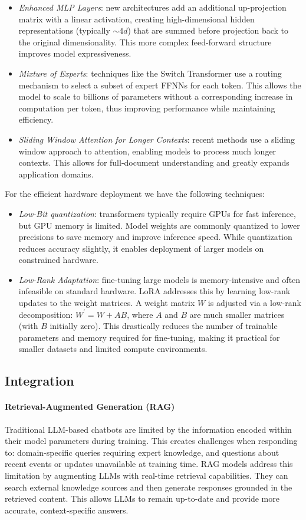 \begin{itemize}
    \item \textit{Enhanced MLP Layers}: new architectures add an additional up-projection matrix with a linear activation, creating high-dimensional hidden representations (typically $\sim4d$) that are summed before projection back to the original dimensionality. 
        This more complex feed-forward structure improves model expressiveness.
    \item \textit{Mixture of Experts}: techniques like the Switch Transformer use a routing mechanism to select a subset of expert FFNNs for each token. 
        This allows the model to scale to billions of parameters without a corresponding increase in computation per token, thus improving performance while maintaining efficiency.
    \item \textit{Sliding Window Attention for Longer Contexts}: recent methods use a sliding window approach to attention, enabling models to process much longer contexts. 
        This allows for full-document understanding and greatly expands application domains.
\end{itemize}
\noindent For the efficient hardware deployment we have the following techniques:
\begin{itemize}
    \item \textit{Low-Bit quantization}: transformers typically require GPUs for fast inference, but GPU memory is limited. 
        Model weights are commonly quantized to lower precisions to save memory and improve inference speed.
        While quantization reduces accuracy slightly, it enables deployment of larger models on constrained hardware.
    \item \textit{Low-Rank Adaptation}: fine-tuning large models is memory-intensive and often infeasible on standard hardware. 
        LoRA addresses this by learning low-rank updates to the weight matrices. 
        A weight matrix $W$ is adjusted via a low-rank decomposition: $W^\prime = W + AB$, where $A$ and $B$ are much smaller matrices (with $B$ initially zero). 
        This drastically reduces the number of trainable parameters and memory required for fine-tuning, making it practical for smaller datasets and limited compute environments.
\end{itemize}

\subsection{Integration}
\paragraph*{Retrieval-Augmented Generation (RAG)}
Traditional LLM-based chatbots are limited by the information encoded within their model parameters during training. 
This creates challenges when responding to: domain-specific queries requiring expert knowledge, and questions about recent events or updates unavailable at training time.
RAG models address this limitation by augmenting LLMs with real-time retrieval capabilities. 
They can search external knowledge sources and then generate responses grounded in the retrieved content. 
This allows LLMs to remain up-to-date and provide more accurate, context-specific answers.

